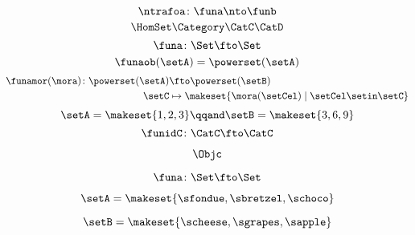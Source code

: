 \begin{forslides}
\begin{forslides}
\begin{equation}
            \ntrafoa\colon\funa\nto\funb
        \end{equation}
        \begin{equation}
            \label{eq:slides_hom}
            \HomSet\Category\CatC\CatD
        \end{equation}
        \begin{equation}
            \label{eq:pow_fun_1}
            \funa\colon \Set \fto \Set
        \end{equation}
        \begin{equation}
            \label{eq:pow_fun_2}
            \funaob(\setA) = \powerset(\setA)
        \end{equation}
        \begin{equation}
            \label{eq:pow_fun_3}
            \begin{aligned}
                \funamor(\mora)\colon \powerset(\setA) & \fto \powerset(\setB) \\
                \setC                                  & \mapsto \makeset{ \mora(\setCel) \mid \setCel \setin \setC}
            \end{aligned}
        \end{equation}
        \begin{equation}
            \label{eq:pow_fun_4}
            \setA=\makeset{ 1,2,3} \qqand \setB=\makeset{3,6,9}
        \end{equation}
        \begin{equation}
            \label{eq:idfun}
            \funidC \colon \CatC \fto \CatC
        \end{equation}


    \begin{equation}
        \label{eq:slides-translation-00}
        \Objc
    \end{equation}

    \begin{equation}
        \label{eq:slides-translation-01}
        \funa\colon \Set \fto \Set
    \end{equation}

    \begin{equation}
        \label{eq:slides-translation-02}
        \setA = \makeset{\sfondue, \sbretzel, \schoco}
    \end{equation}

    \begin{equation}
        \label{eq:slides-translation-03}
        \setB = \makeset{\scheese,\sgrapes,\sapple}
    \end{equation}


\end{forslides}
\end{forslides}
